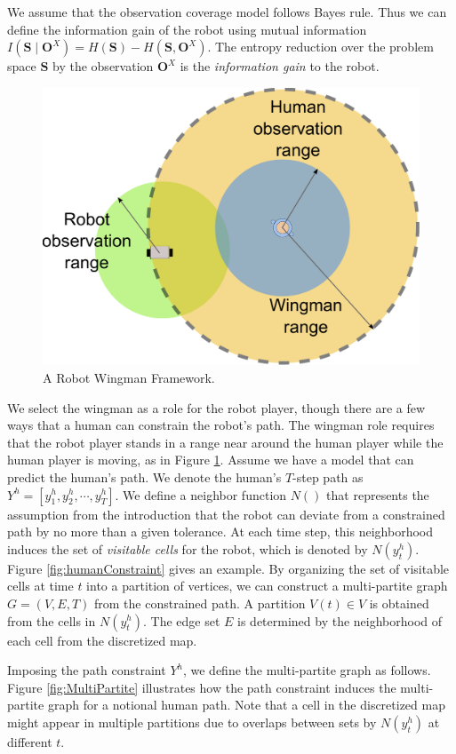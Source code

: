 \documentclass[phd]{byuprop}
\begin{document}
We assume that the observation coverage model follows Bayes rule.
Thus we can define the information gain of the robot using mutual information $ I( \mathbf{S} \mid \mathbf{O}^{X} ) =  H( \mathbf{S} ) - H( \mathbf{S}, \mathbf{O}^{X}  ) $.
The entropy reduction over the problem space $ \mathbf{S} $ by the observation $ \mathbf{O}^{X} $ is the {\em information gain} to the robot.

\begin{figure}[hbtp]
\centering
\includegraphics[width=0.37\linewidth]{./fig/Wingman.pdf}
\caption{A Robot Wingman Framework.}
\label{fig:Wingman}
\end{figure}

We select the wingman as a role for the robot player, though there are a few ways that a human can constrain the robot's path.
The wingman role requires that the robot player stands in a range near around the human player while the human player is moving, as in Figure \ref{fig:Wingman}.
Assume we have a model that can predict the human's path.
We denote the human's $T$-step path as $ Y^{h} = [y^{h}_{1}, y^{h}_{2} , \cdots , y^{h}_{T}] $.
We define a neighbor function $ N () $ that represents the assumption from the introduction that the robot can deviate from a constrained path by no more than a given tolerance.  
At each time step, this neighborhood induces the set of {\em visitable cells} for the robot, which is denoted by $ N( y^{h}_{t} ) $.
Figure \ref{fig:humanConstraint} gives an example.
By organizing the set of visitable cells at time $ t $ into a partition of vertices, we can construct a multi-partite graph $ G = (V, E, T) $ from the constrained path.
A partition $ V(t) \in V $ is obtained from the cells in $ N( y^{h}_{t} ) $.
The edge set $ E $ is determined by the neighborhood of each cell from the discretized map.

Imposing the path constraint $ Y^{h} $, we define the multi-partite graph as follows.
Figure \ref{fig:MultiPartite} illustrates how the path constraint induces the multi-partite graph for a notional human path.
Note that a cell in the discretized map might appear in multiple partitions due to overlaps between sets by $ N( y^{h}_{t} ) $ at different $ t $.
\end{document}
